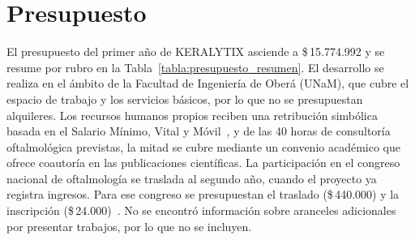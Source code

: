 \vspace{-0.5 cm}
\section{Presupuesto}

    El presupuesto del primer año de KERALYTIX asciende a \$\,15.774.992 y se resume por rubro en la Tabla~\ref{tabla:presupuesto_resumen}. El desarrollo se realiza en el ámbito de la Facultad de Ingeniería de Oberá (UNaM), que cubre el espacio de trabajo y los servicios básicos, por lo que no se presupuestan alquileres. Los recursos humanos propios reciben una retribución simbólica basada en el Salario Mínimo, Vital y Móvil~\cite{cita:SMVM}, y de las 40 horas de consultoría oftalmológica previstas, la mitad se cubre mediante un convenio académico que ofrece coautoría en las publicaciones científicas. La participación en el congreso nacional de oftalmología se traslada al segundo año, cuando el proyecto ya registra ingresos. Para ese congreso se presupuestan el traslado (\$\,440.000) y la inscripción (\$\,24.000)~\cite{cita:aranceles_congreso_oftalmología}. No se encontró información sobre aranceles adicionales por presentar trabajos, por lo que no se incluyen.

